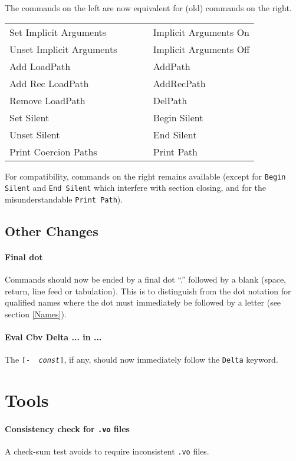 \documentclass[11pt]{article}
\begin{document}
The commands on the left are now equivalent for (old) commands on
the right.

\medskip

\begin{tt}
\begin{tabular}{ll}
Set Implicit Arguments & Implicit Arguments On \\
Unset Implicit Arguments ~~~~~ & Implicit Arguments Off \\
Add LoadPath & AddPath \\
Add Rec LoadPath & AddRecPath \\
Remove LoadPath & DelPath \\
Set Silent & Begin Silent \\
Unset Silent & End Silent \\
Print Coercion Paths & Print Path\\
\end{tabular}
\end{tt}

\medskip

For compatibility, commands on the right remains available (except for
{\tt Begin Silent} and {\tt End Silent} which interfere with
section closing, and for the misunderstandable {\tt Print Path}).

\subsection{Other Changes}


\paragraph{Final dot} Commands should now be ended by a final dot ``.'' followed by a blank
(space, return, line feed or tabulation). This is to distinguish from
the dot notation for qualified names where the dot must immediately be
followed by a letter (see section \ref{Names}).

\paragraph{Eval Cbv Delta ... in ...} The {\tt [- {\it
const}]}, if any, should now immediately follow the {\tt Delta} keyword.


\section{Tools}
\label{Tools}

\paragraph{Consistency check for {\tt .vo} files} A check-sum test
avoids to require inconsistent {\tt .vo} files.
\end{document}
